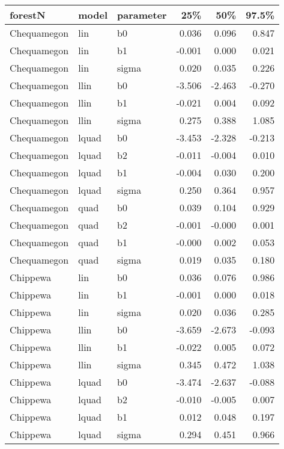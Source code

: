 \begin{table}[ht]
\begin{center}
\begin{tabular}{lllrrr}
  \hline
forestN & model & parameter & 25\% & 50\% & 97.5\% \\ 
  \hline
Chequamegon & lin & b0 & 0.036 & 0.096 & 0.847 \\ 
  Chequamegon & lin & b1 & -0.001 & 0.000 & 0.021 \\ 
  Chequamegon & lin & sigma & 0.020 & 0.035 & 0.226 \\ 
  Chequamegon & llin & b0 & -3.506 & -2.463 & -0.270 \\ 
  Chequamegon & llin & b1 & -0.021 & 0.004 & 0.092 \\ 
  Chequamegon & llin & sigma & 0.275 & 0.388 & 1.085 \\ 
  Chequamegon & lquad & b0 & -3.453 & -2.328 & -0.213 \\ 
  Chequamegon & lquad & b2 & -0.011 & -0.004 & 0.010 \\ 
  Chequamegon & lquad & b1 & -0.004 & 0.030 & 0.200 \\ 
  Chequamegon & lquad & sigma & 0.250 & 0.364 & 0.957 \\ 
  Chequamegon & quad & b0 & 0.039 & 0.104 & 0.929 \\ 
  Chequamegon & quad & b2 & -0.001 & -0.000 & 0.001 \\ 
  Chequamegon & quad & b1 & -0.000 & 0.002 & 0.053 \\ 
  Chequamegon & quad & sigma & 0.019 & 0.035 & 0.180 \\ 
  Chippewa & lin & b0 & 0.036 & 0.076 & 0.986 \\ 
  Chippewa & lin & b1 & -0.001 & 0.000 & 0.018 \\ 
  Chippewa & lin & sigma & 0.020 & 0.036 & 0.285 \\ 
  Chippewa & llin & b0 & -3.659 & -2.673 & -0.093 \\ 
  Chippewa & llin & b1 & -0.022 & 0.005 & 0.072 \\ 
  Chippewa & llin & sigma & 0.345 & 0.472 & 1.038 \\ 
  Chippewa & lquad & b0 & -3.474 & -2.637 & -0.088 \\ 
  Chippewa & lquad & b2 & -0.010 & -0.005 & 0.007 \\ 
  Chippewa & lquad & b1 & 0.012 & 0.048 & 0.197 \\ 
  Chippewa & lquad & sigma & 0.294 & 0.451 & 0.966 \\ 

\end{tabular}
\end{center}
\end{table}
